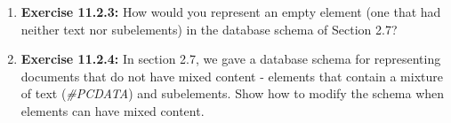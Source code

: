 \documentclass[12pt]{article}
\begin{document}
\begin{enumerate}[1.]
    \item \textbf{Exercise 11.2.3:} How would you represent an empty element (one that had
    neither text nor subelements) in the database schema of Section 2.7?

    \item \textbf{Exercise 11.2.4:} In section 2.7, we gave a database schema for representing
    documents that do not have mixed content - elements that contain a mixture
    of text (\textit{\#PCDATA}) and subelements. Show how to modify the schema when
    elements can have mixed content.

\end{enumerate}
\end{document}
